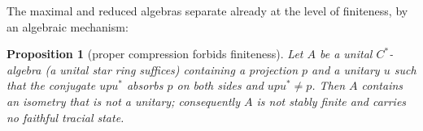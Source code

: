 \documentclass[11pt]{amsart}
\newcommand{\leanverified}[2]{\ignorespaces}
\newtheorem{proposition}[theorem]{Proposition}
\theoremstyle{definition}
\theoremstyle{remark}
\theoremstyle{plain}
\begin{document}
The maximal and reduced algebras separate already at the level of
finiteness, by an algebraic mechanism:

\begin{proposition}[proper compression forbids finiteness]\label{prop:proper-isometry}
Let $A$ be a unital $C^*$-algebra (a unital star ring suffices)
containing a projection $p$ and a unitary $u$ such that the conjugate
$upu^{*}$ absorbs $p$ on both sides and $upu^{*}\ne p$.  Then $A$
contains an isometry that is not a unitary; consequently $A$ is not
stably finite and carries no faithful tracial state.
\leanverified{Analysis/ProperIsometryFromCompression}{GroupApproximation.ProperProjectionCompression.isometry_not_isUnit}
\leanverified{Analysis/ProperIsometryFromCompression}{GroupApproximation.ProperProjectionCompression.not_isStablyFiniteRing}
\leanverified{Analysis/ProperIsometryFromCompression}{GroupApproximation.ProperProjectionCompression.no_faithfulTracialState}
\end{proposition}
\end{document}
